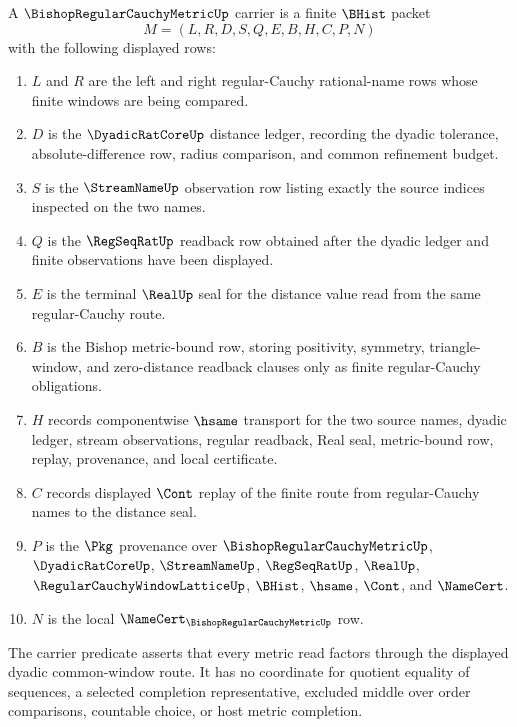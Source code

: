 \begin{definition}
\label{def:bishop-regular-cauchy-metric-carrier}
A $\BishopRegularCauchyMetricUp$ carrier is a finite $\BHist$ packet
$$
M=(L,R,D,S,Q,E,B,H,C,P,N)
$$
with the following displayed rows:
\begin{enumerate}
\item $L$ and $R$ are the left and right regular-Cauchy rational-name rows whose finite windows are being compared.
\item $D$ is the $\DyadicRatCoreUp$ distance ledger, recording the dyadic tolerance, absolute-difference row, radius comparison, and common refinement budget.
\item $S$ is the $\StreamNameUp$ observation row listing exactly the source indices inspected on the two names.
\item $Q$ is the $\RegSeqRatUp$ readback row obtained after the dyadic ledger and finite observations have been displayed.
\item $E$ is the terminal $\RealUp$ seal for the distance value read from the same regular-Cauchy route.
\item $B$ is the Bishop metric-bound row, storing positivity, symmetry, triangle-window, and zero-distance readback clauses only as finite regular-Cauchy obligations.
\item $H$ records componentwise $\hsame$ transport for the two source names, dyadic ledger, stream observations, regular readback, Real seal, metric-bound row, replay, provenance, and local certificate.
\item $C$ records displayed $\Cont$ replay of the finite route from regular-Cauchy names to the distance seal.
\item $P$ is the $\Pkg$ provenance over $\BishopRegularCauchyMetricUp$, $\DyadicRatCoreUp$, $\StreamNameUp$, $\RegSeqRatUp$, $\RealUp$, $\RegularCauchyWindowLatticeUp$, $\BHist$, $\hsame$, $\Cont$, and $\NameCert$.
\item $N$ is the local $\NameCert_{\BishopRegularCauchyMetricUp}$ row.
\end{enumerate}
The carrier predicate asserts that every metric read factors through the displayed dyadic common-window route. It has no coordinate for quotient equality of sequences, a selected completion representative, excluded middle over order comparisons, countable choice, or host metric completion.
\end{definition}

